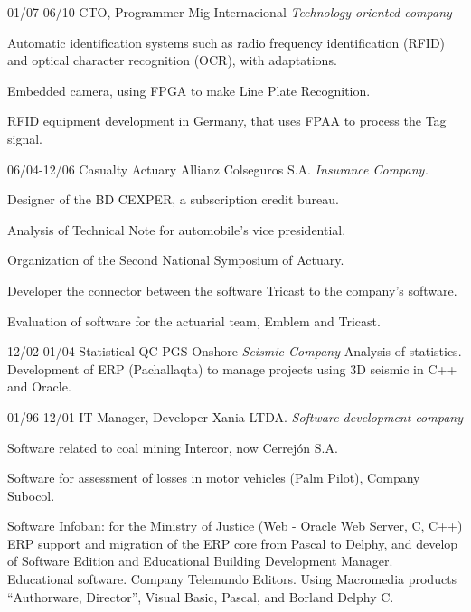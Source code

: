 \begin{entrylist}
  \entry
	{01/07-06/10}
	{CTO, Programmer}
	{Mig Internacional {\sl Technology-oriented company}}
	{Automatic identification systems such as radio frequency identification (RFID)
and optical character recognition (OCR), with adaptations.

Embedded camera, using FPGA to make Line Plate Recognition.

RFID equipment development in Germany, that uses FPAA to process the
	Tag signal.}

  \entry
	{06/04-12/06}
	{Casualty Actuary}
	{Allianz Colseguros S.A. {\sl Insurance Company.}}
	{Designer of the BD CEXPER, a subscription credit bureau.

Analysis of Technical Note for automobile’s vice presidential.

Organization of the Second National Symposium of Actuary.

Developer the connector between the software Tricast to the company's software.

Evaluation of software for the actuarial team, Emblem and Tricast.}

  \entry
	{12/02-01/04}
	{Statistical QC}
	{PGS Onshore {\sl Seismic Company}}
	{Analysis of statistics. Development of ERP (Pachallaqta) to manage projects
	using 3D seismic in C++ and Oracle.}

  \entry
	{01/96-12/01}
	{IT Manager, Developer}
	{Xania LTDA. {\sl Software development company}}
	{Software related to coal mining Intercor, now Cerrejón S.A.

Software for assessment of losses in motor vehicles (Palm Pilot), Company
Subocol.

Software Infoban: for the Ministry of Justice (Web - Oracle Web Server, C, C++)
ERP support and migration of the ERP core from Pascal to Delphy, and develop
of Software Edition and Educational Building Development Manager.
Educational software. Company Telemundo Editors. Using Macromedia
products “Authorware, Director”, Visual Basic, Pascal, and Borland Delphy C.


}

  \end{entrylist}
